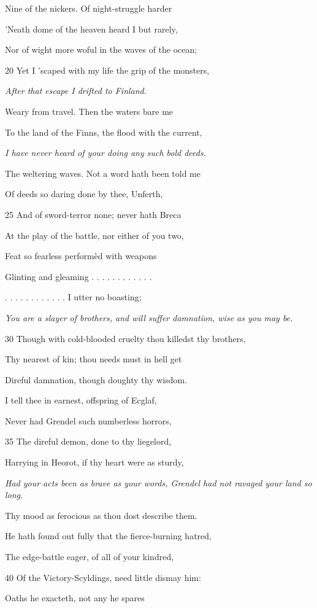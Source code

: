 Nine of the nickers. Of night-struggle harder

’Neath dome of the heaven heard I but rarely,

Nor of wight more woful in the waves of the ocean;

20
Yet I ’scaped with my life the grip of the monsters,

\emph{After that escape I
drifted to Finland.}

Weary from travel. Then the waters bare me

To the land of the Finns, the flood with the current,

\emph{I have never heard
of your doing any
such bold deeds.}

The weltering waves. Not a word hath been told me

Of deeds so daring done by thee, Unferth,

25
And of sword-terror none; never hath Breca

At the play of the battle, nor either of you two,

Feat so fearless performèd with weapons

Glinting and gleaming . . . . . . . . . . . .

. . . . . . . . . . . . I utter no boasting;

\emph{You are a slayer of
brothers, and will
suffer damnation,
wise as you may
be.}

30
Though with cold-blooded cruelty thou killedst thy brothers,

Thy nearest of kin; thou needs must in hell get

Direful damnation, though doughty thy wisdom.

I tell thee in earnest, offspring of Ecglaf,

Never had Grendel such numberless horrors,

35
The direful demon, done to thy liegelord,

Harrying in Heorot, if thy heart were as sturdy,

\emph{Had your acts been
as brave as your
words, Grendel had
not ravaged your
land so long.}

Thy mood as ferocious as thou dost describe them.

He hath found out fully that the fierce-burning hatred,

The edge-battle eager, of all of your kindred,

40
Of the Victory-Scyldings, need little dismay him:

Oaths he exacteth, not any he spares

